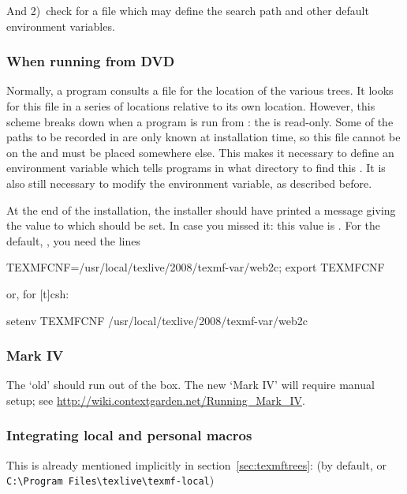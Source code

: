 \documentclass{article}
\begin{document}
And 2)~check for a file  which may define the
search path and other default environment variables.


\subsubsection{When running from DVD}

Normally, a \TL{} program consults a file  for the
location of the various trees. It looks for this file in a series of
locations relative to its own location. However, this scheme breaks down
when a program is run from \DVD{}: the \DVD{} is read-only. Some of the
paths to be recorded in  are only known at
installation time, so this file cannot be on the \DVD{} and must be
placed somewhere else. This makes it necessary to define an environment
 variable which tells \TL{} programs in what directory
to find this .  It is also still necessary to modify
the  environment variable, as described before.

At the end of the installation, the installer should have printed a
message giving the value to which  should be set. In
case you missed it: this value is . For the
default, , you need the
lines
\begin{sverbatim}
TEXMFCNF=/usr/local/texlive/2008/texmf-var/web2c; export TEXMFCNF
\end{sverbatim}
or, for [t]csh:
\begin{sverbatim}
setenv TEXMFCNF /usr/local/texlive/2008/texmf-var/web2c
\end{sverbatim}


\subsubsection{\ConTeXt{} Mark IV}

The `old' \ConTeXt{} should run out of the box. The new `Mark IV'
\ConTeXt{} will require manual setup; see
\url{http://wiki.contextgarden.net/Running_Mark_IV}.


\subsubsection{Integrating local and personal macros}
\label{sec:local-personal-macros}

This is already mentioned implicitly in section~\ref{sec:texmftrees}:
 (by default,
 or
\verb|C:\Program Files\texlive\texmf-local|)
\end{document}
